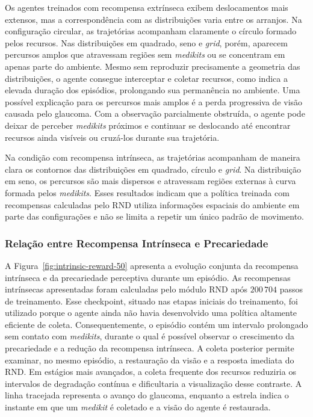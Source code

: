 Os agentes treinados com recompensa extrínseca exibem deslocamentos mais extensos, mas a correspondência com as distribuições varia entre os arranjos. Na configuração circular, as trajetórias acompanham claramente o círculo formado pelos recursos. Nas distribuições em quadrado, seno e \textit{grid}, porém, aparecem percursos amplos que atravessam regiões sem \textit{medikits} ou se concentram em apenas parte do ambiente. Mesmo sem reproduzir precisamente a geometria das distribuições, o agente consegue interceptar e coletar recursos, como indica a elevada duração dos episódios, prolongando sua permanência no ambiente. Uma possível explicação para os percursos mais amplos é a perda progressiva de visão causada pelo glaucoma. Com a observação parcialmente obstruída, o agente pode deixar de perceber \textit{medikits} próximos e continuar se deslocando até encontrar recursos ainda visíveis ou cruzá-los durante sua trajetória.

Na condição com recompensa intrínseca, as trajetórias acompanham de maneira clara os contornos das distribuições em quadrado, círculo e \textit{grid}. Na distribuição em seno, os percursos são mais dispersos e atravessam regiões externas à curva formada pelos \textit{medikits}. Esses resultados indicam que a política treinada com recompensas calculadas pelo RND utiliza informações espaciais do ambiente em parte das configurações e não se limita a repetir um único padrão de movimento.

\subsubsection{Relação entre Recompensa Intrínseca e Precariedade}

A Figura~\ref{fig:intrinsic-reward-50} apresenta a evolução conjunta da recompensa intrínseca e da precariedade perceptiva durante um episódio. As recompensas intrínsecas apresentadas foram calculadas pelo módulo RND após $200\,704$ passos de treinamento. Esse checkpoint, situado nas etapas iniciais do treinamento, foi utilizado porque o agente ainda não havia desenvolvido uma política altamente eficiente de coleta. Consequentemente, o episódio contém um intervalo prolongado sem contato com \textit{medikits}, durante o qual é possível observar o crescimento da precariedade e a redução da recompensa intrínseca. A coleta posterior permite examinar, no mesmo episódio, a restauração da visão e a resposta imediata do RND. Em estágios mais avançados, a coleta frequente dos recursos reduziria os intervalos de degradação contínua e dificultaria a visualização desse contraste. A linha tracejada representa o avanço do glaucoma, enquanto a estrela indica o instante em que um \textit{medikit} é coletado e a visão do agente é restaurada.


